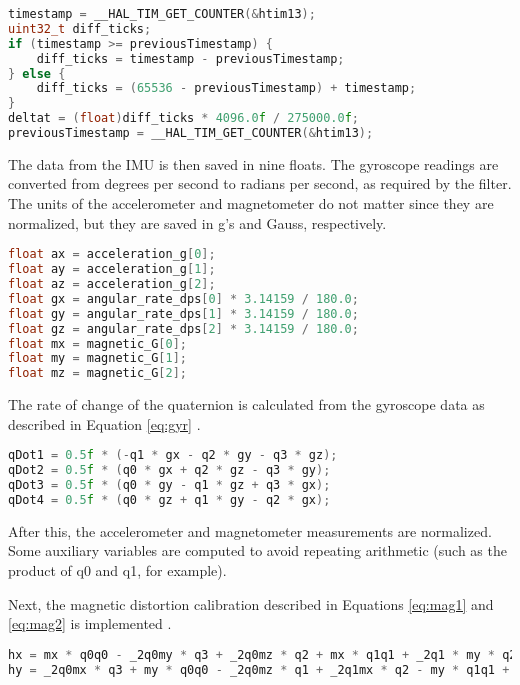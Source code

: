 \documentclass[11pt]{ucthesisCP}
\begin{document}
\begin{lstlisting}[language=C++]
timestamp = __HAL_TIM_GET_COUNTER(&htim13);
uint32_t diff_ticks;
if (timestamp >= previousTimestamp) {
	diff_ticks = timestamp - previousTimestamp;
} else {
	diff_ticks = (65536 - previousTimestamp) + timestamp;
}
deltat = (float)diff_ticks * 4096.0f / 275000.0f;
previousTimestamp = __HAL_TIM_GET_COUNTER(&htim13);
\end{lstlisting}

The data from the IMU is then saved in nine floats. The gyroscope readings are converted from degrees per second to radians per second, as required by the filter. The units of the accelerometer and magnetometer do not matter since they are normalized, but they are saved in g’s and Gauss, respectively.

\begin{lstlisting}[language=C++]
float ax = acceleration_g[0];
float ay = acceleration_g[1];
float az = acceleration_g[2];
float gx = angular_rate_dps[0] * 3.14159 / 180.0;
float gy = angular_rate_dps[1] * 3.14159 / 180.0;
float gz = angular_rate_dps[2] * 3.14159 / 180.0;
float mx = magnetic_G[0];
float my = magnetic_G[1];
float mz = magnetic_G[2];
\end{lstlisting}

The rate of change of the quaternion is calculated from the gyroscope data as described in Equation \ref{eq:gyr} \cite{xiotech}.

\begin{lstlisting}[language=C++]
qDot1 = 0.5f * (-q1 * gx - q2 * gy - q3 * gz);
qDot2 = 0.5f * (q0 * gx + q2 * gz - q3 * gy);
qDot3 = 0.5f * (q0 * gy - q1 * gz + q3 * gx);
qDot4 = 0.5f * (q0 * gz + q1 * gy - q2 * gx);
\end{lstlisting}

After this, the accelerometer and magnetometer measurements are normalized. Some auxiliary variables are computed to avoid repeating arithmetic (such as the product of q0 and q1, for example). 

Next, the magnetic distortion calibration described in Equations \ref{eq:mag1} and \ref{eq:mag2} is implemented \cite{xiotech}.

\begin{lstlisting}[language=C++]
hx = mx * q0q0 - _2q0my * q3 + _2q0mz * q2 + mx * q1q1 + _2q1 * my * q2 + _2q1 * mz * q3 - mx * q2q2 - mx * q3q3;
hy = _2q0mx * q3 + my * q0q0 - _2q0mz * q1 + _2q1mx * q2 - my * q1q1 + my * q2q2 + _2q2 * mz * q3 - my * q3q3;
\end{lstlisting}
\end{document}
